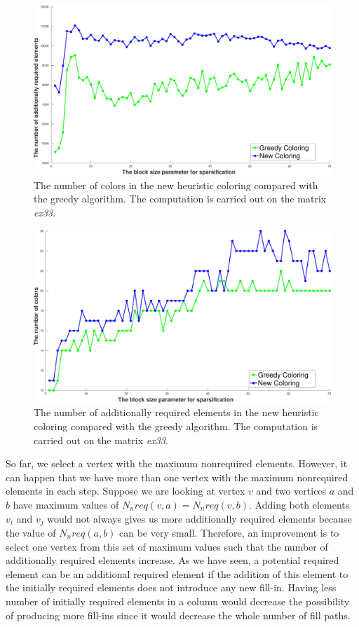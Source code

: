 \documentclass[12pt, oneside]{book}
\newcommand{\todo}[1]{\textbf{#1}}
\begin{document}
\begin{figure}
\centering
\includegraphics[width=0.9\linewidth]{bls_adds_ex33_without_alpha}
\caption{The number of colors in the new heuristic coloring compared with the greedy algorithm.
The computation is carried out on the matrix \textit{ex33}. }
\label{bls_adds_ex33_without_alpha}
\end{figure}

\begin{figure}
\centering
\includegraphics[width=0.9\linewidth]{bls_cols_ex33_without_alpha}
\caption{The number of additionally required elements in the new heuristic coloring compared with the greedy algorithm.
The computation is carried out on the matrix \textit{ex33}. }
\label{bls_cols_ex33_without_alpha}
\end{figure}

So far, we select a vertex with the maximum nonrequired elements. However, it can happen
that we have more than one vertex with the maximum nonrequired elements in each step.
Suppose we are looking at vertex $v$ and two vertices $a$ and $b$ have maximum values of 
$N_nreq(v,a) = N_nreq(v,b)$.
Adding both elements $v_i$ and $v_j$ would not always gives us more additionally required elements 
because the value of $N_nreq(a,b)$ can be very small. 
Therefore, an improvement is to select one vertex from this set of maximum values such that the number of
additionally required elements increase. As we have seen, a potential required element can be 
an additional required element if the addition of this element to the initially required elements
does not introduce any new fill-in. Having less number of initially required elements in a column would decrease
the possibility of producing more fill-ins since it would decrease the whole number of fill paths. \todo{}
\end{document}
